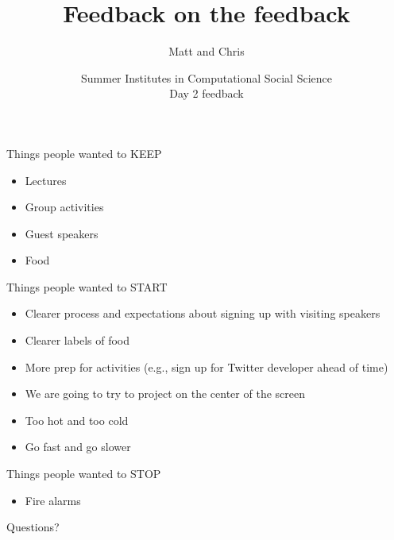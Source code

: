 \documentclass{beamer}
\title[]{Feedback on the feedback}
\author[]{Matt and Chris}
\date[]{Summer Institutes in Computational Social Science\\Day 2 feedback
}
\begin{document}
\frame{\titlepage}
\begin{frame}

Things people wanted to KEEP
\begin{itemize}
\item Lectures
\item Group activities
\item Guest speakers
\item Food
\end{itemize}

\end{frame}
\begin{frame}

Things people wanted to START
\begin{itemize}
\item Clearer process and expectations about signing up with visiting speakers
\pause
\item Clearer labels of food
\pause
\item More prep for activities (e.g., sign up for Twitter developer ahead of time)
\pause
\item We are going to try to project on the center of the screen
\pause
\item Too hot and too cold
\pause
\item Go fast and go slower
\end{itemize}

\end{frame}
\begin{frame}

Things people wanted to STOP
\begin{itemize}
\item Fire alarms
\end{itemize}

\end{frame}
\begin{frame}

\begin{center}
\LARGE
Questions?
\end{center}

\end{frame}
\end{document}
